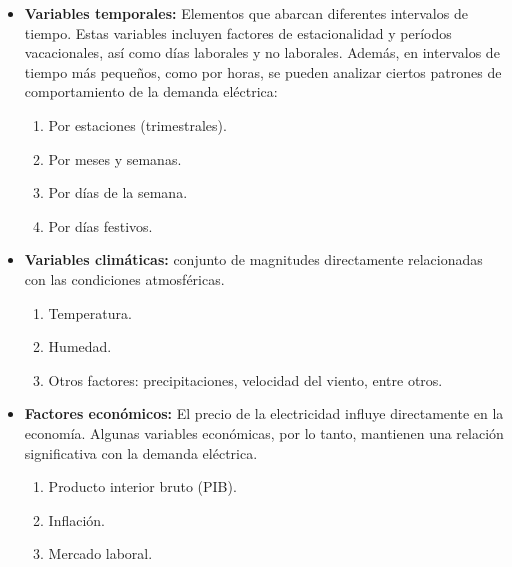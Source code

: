 \documentclass[12pt,a4paper]{report}
\begin{document}
\begin{itemize}
    \item \textbf{Variables temporales:} Elementos que abarcan diferentes intervalos de tiempo. Estas variables incluyen factores de estacionalidad y períodos vacacionales, así como días laborales y no laborales. Además, en intervalos de tiempo más pequeños, como por horas, se pueden analizar ciertos patrones de comportamiento de la demanda eléctrica:
    \begin{enumerate}
        \item Por estaciones (trimestrales).
        \item Por meses y semanas.
        \item Por días de la semana.
        \item Por días festivos.
    \end{enumerate}
    
\end{itemize}

\begin{itemize}
    \item \textbf{Variables climáticas:} conjunto de magnitudes directamente relacionadas con las condiciones atmosféricas.
    \begin{enumerate}
        \item Temperatura.
        \item Humedad.
        \item Otros factores: precipitaciones, velocidad del viento, entre otros.
        
    \end{enumerate}
    
\end{itemize}

\begin{itemize}
    \item \textbf{Factores económicos:} El precio de la electricidad influye directamente en la economía. Algunas variables económicas, por lo tanto, mantienen una relación significativa con la demanda eléctrica.
    \begin{enumerate}
        \item Producto interior bruto (PIB).
        \item Inflación.
        \item Mercado laboral.
        
    \end{enumerate}
    
\end{itemize}
\end{document}

